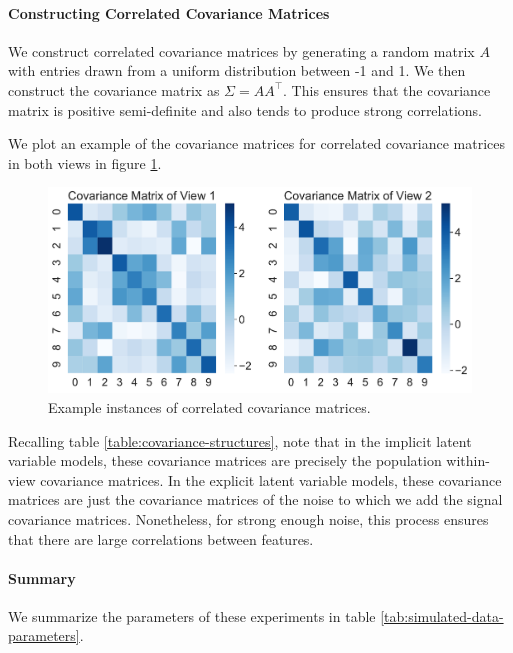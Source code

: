 \paragraph{Constructing Correlated Covariance Matrices}

We construct correlated covariance matrices by generating a random matrix $A$ with entries drawn from a uniform distribution between -1 and 1. We then construct the covariance matrix as $\Sigma = AA^\top$. This ensures that the covariance matrix is positive semi-definite and also tends to produce strong correlations.

We plot an example of the covariance matrices for correlated covariance matrices in both views in figure \ref{fig:covariance-matrices}.

\begin{figure}
    \centering
    \includegraphics[width=0.8\linewidth]{figures/simulated/True_Covariance_Correlated_Covariance_implicit.pdf}
    \caption{Example instances of correlated covariance matrices.}\label{fig:covariance-matrices}
\end{figure}

Recalling table \ref{table:covariance-structures}, note that in the implicit latent variable models, these covariance matrices are precisely the population within-view covariance matrices.
In the explicit latent variable models, these covariance matrices are just the covariance matrices of the noise to which we add the signal covariance matrices. Nonetheless, for strong enough noise, this process ensures that there are large correlations between features.

\paragraph{Summary} We summarize the parameters of these experiments in table \ref{tab:simulated-data-parameters}.

